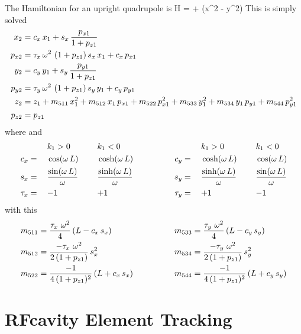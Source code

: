 The Hamiltonian for an upright quadrupole is
\Begineq
  H =  +  (x^2 - y^2)
\Endeq
This is simply solved
\begin{align}
  x_2    &= c_x \, x_1 + s_x \, \frac{p_{x1}}{1 + p_{z1}} \nonumber \\
  p_{x2} &= \tau_x \, \omega^2 \, \, (1 + p_{z1}) \, s_x \, x_1 + c_x \, p_{x1} \nonumber \\
  y_2    &= c_y \, y_1 + s_y \, \frac{p_{y1}}{1 + p_{z1}} \nonumber \\
  p_{y2} &= \tau_y \, \omega^2 \, \, (1 + p_{z1}) \, s_y \, y_1 + c_y \, p_{y1} \\
  z_2    &= z_1 + m_{511} \, x_1^2 + m_{512} \, x_1 \, p_{x1} + m_{522} \, p_{x1}^2 + 
                   m_{533} \, y_1^2 + m_{534} \, y_1 \, p_{y1} + m_{544} \, p_{y1}^2 \nonumber \\
  p_{z2} &= p_{z1} \nonumber
\end{align}
where 
\Begineq
  \om \equiv {}
\Endeq
and
\begin{alignat}{6}
         &\hspace*{3ex}  && k_1 > 0          &\hspace*{3ex}& k_1 < 0 & \qquad \qquad
         &\hspace*{3ex}  && k_1 > 0          &\hspace*{3ex}& k_1 < 0 \nonumber \\
     c_x &=   && \cos  (\omega \, L) && \cosh (\omega \, L) & \qquad \qquad
     c_y &=   && \cosh (\omega \, L) && \cos  (\omega \, L) \nonumber \\
     s_x &=   && \frac{\sin  (\omega \, L)}{\omega} && \frac{\sinh (\omega \, L)}{\omega} & \qquad \qquad
     s_y &=   && \frac{\sinh (\omega \, L)}{\omega} && \frac{\sin  (\omega \, L)}{\omega} \\
  \tau_x &=   && {-}1             && {+}1             & \qquad \qquad
  \tau_y &=   && {+}1             && {-}1             \nonumber
\end{alignat}
with this
\begin{alignat}{2}
  m_{511} &= \frac{\tau_x \,\, \omega^2}{4} \, (L - c_x \, s_x) & \qquad \qquad
  m_{533} &= \frac{\tau_y \,\, \omega^2}{4} \, (L - c_y \, s_y) \nonumber \\
  m_{512} &= \frac{-\tau_x \,\, \omega^2}{2 \, (1 + p_{z1})} \, s_x^2 & \qquad \qquad
  m_{534} &= \frac{-\tau_y \,\, \omega^2}{2 \, (1 + p_{z1})} \, s_y^2 \\
  m_{522} &= \frac{-1}{4 \, (1 + p_{z1})^2} \, (L + c_x \, s_x) & \qquad \qquad
  m_{544} &= \frac{-1}{4 \, (1 + p_{z1})^2} \, (L + c_y \, s_y) \nonumber
\end{alignat}


\section{RFcavity Element Tracking}
\label{s:rfcavity.std}

